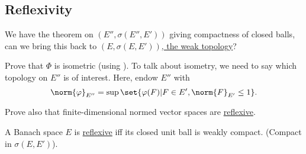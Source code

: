\documentclass[twoside]{article}
\begin{document}
\subsection{Reflexivity}
\begin{aim}
    We have the  theorem on \hyperlink{def:weakstar}{$(E'', \sigma(E'', E'))$} giving compactness of closed balls, can we bring this back to \hyperlink{def:weak}{$(E, \sigma(E, E'))$, the weak topology}?
\end{aim}
\begin{ex}
  Prove that $\Phi$ is isometric (using ).
    To talk about isometry, we need to say which topology on \hyperlink{def:dualSpace}{$E''$} is of interest.
    Here, endow $E''$ \hypertarget{def:doubleDualNorm}{with}
    \begin{equation*}
        \norm{\varphi}_{E''} = \sup\set{\varphi(F) | F \in E', \norm{F}_{E'} \leq 1}.
    \end{equation*}

    Prove also that finite-dimensional normed vector spaces are \hyperlink{def:refl}{reflexive}.
\end{ex}
\begin{thm}\label{thm:kaku}
    A Banach space $E$ is \hyperlink{def:refl}{reflexive} iff its closed unit ball is weakly compact. (Compact in \hyperlink{def:weak}{$\sigma(E, E')$}).
\end{thm}
\end{document}
